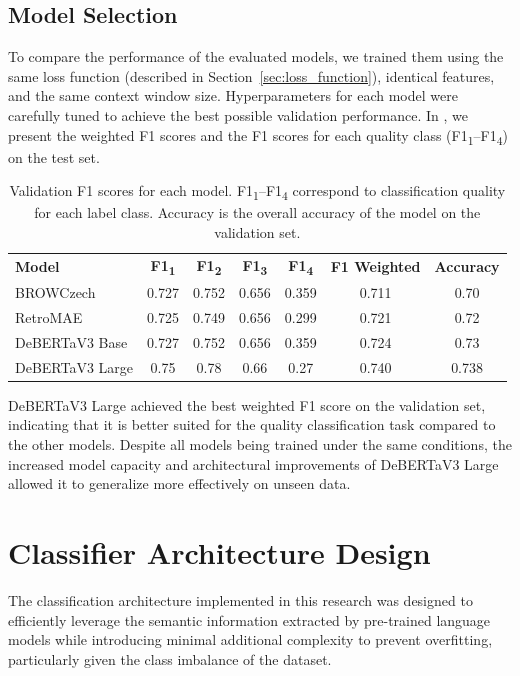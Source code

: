 \subsection{Model Selection}
To compare the performance of the evaluated models, we trained them using the same loss function 
(described in Section~\ref{sec:loss_function}), identical features, and the same context window size. Hyperparameters for each model were carefully tuned to achieve the best possible validation performance. In , we present the weighted F1 scores and the F1 scores for each quality class (F1\textsubscript{1}--F1\textsubscript{4}) on the test set.

\begin{table}[H]
\centering
\begin{tabular}{lcccccc}
\textbf{Model} & \textbf{F1\textsubscript{1}} & \textbf{F1\textsubscript{2}} & \textbf{F1\textsubscript{3}} & \textbf{F1\textsubscript{4}} & \textbf{F1 Weighted} & \textbf{Accuracy}\\
\ac{BROWCzech} & 0.727 & 0.752 & 0.656 & 0.359 & 0.711 & 0.70 \\
\ac{RetroMAE} & 0.725 & 0.749 & 0.656 & 0.299 & 0.721 & 0.72 \\
\ac{DeBERTaV3} Base & 0.727 & 0.752 & 0.656 & 0.359 & 0.724 & 0.73 \\
\ac{DeBERTaV3} Large & 0.75 & 0.78 & 0.66 & 0.27 & 0.740 & 0.738 \\
\end{tabular}
\caption{Validation F1 scores for each model. F1\textsubscript{1}--F1\textsubscript{4} correspond to classification quality for each label class. Accuracy is the overall accuracy of the model on the validation set.}
\label{tab:validation_scores}
\end{table}

DeBERTaV3 Large achieved the best weighted F1 score on the validation set, indicating that it is better suited for the quality classification task compared to the other models. Despite all models being trained under the same conditions, the increased model capacity and architectural improvements of DeBERTaV3 Large allowed it to generalize more effectively on unseen data.

\newpage
\section{Classifier Architecture Design}
The classification architecture implemented in this research was designed to efficiently leverage the semantic information extracted by pre-trained language models while introducing minimal additional complexity to prevent overfitting, particularly given the class imbalance of the dataset.

